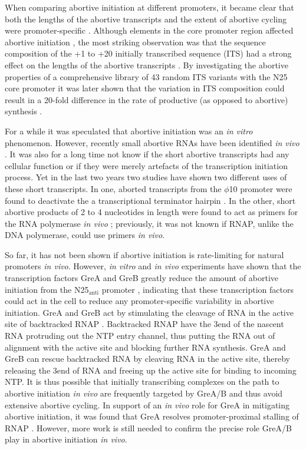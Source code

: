 When comparing abortive initiation at different promoters, it became clear that
both the lengths of the abortive transcripts and the extent of abortive cycling
were promoter-specific \cite{hsu_vitro_2003}. Although elements in the core
promoter region affected abortive initiation \cite{vo_vitro_2003}, the most
striking observation was that the sequence composition of the +1 to +20
initially transcribed sequence (ITS) had a strong effect on the lengths of the
abortive transcripts \cite{hsu_vitro_2003}. By investigating the abortive
properties of a comprehensive library of 43 random ITS variants with the N25
core promoter it was later shown that the variation in ITS composition could
result in a 20-fold difference in the rate of productive (as opposed to
abortive) synthesis \cite{hsu_initial_2006}. 

For a while it was speculated that abortive initiation was an \textit{in vitro}
phenomenon. However, recently small abortive RNAs have been identified
\textit{in vivo} \cite{goldman_direct_2009}. It was also for a long time not
know if the short abortive transcripts had any cellular function or if they
were merely artefacts of the transcription initiation process. Yet in the last
two years two studies have shown two different uses of these short transcripts.
In one, aborted transcripts from the $\phi$10 promoter were found to deactivate
the a transcriptional terminator hairpin \cite{lee_tiny_2010}. In the other,
short abortive products of 2 to 4 nucleotides in length were found to act as
primers for the RNA polymerase \textit{in vivo} \cite{goldman_nanornas_2011};
previously, it was not known if RNAP, unlike the DNA polymerase, could use
primers \textit{in vivo}.

So far, it has not been shown if abortive initiation is rate-limiting for
natural promoters \textit{in vivo}. However, \textit{in vitro} and \textit{in
vivo} experiments have shown that the transcription factors GreA and GreB
greatly reduce the amount of abortive initiation from the N25$_{\text{anti}}$
promoter \cite{hsu_escherichia_1995}, indicating that these transcription
factors could act in the cell to reduce any promoter-specific variability in
abortive initiation. GreA and GreB act by stimulating the cleavage of RNA in
the active site of backtracked RNAP \cite{toulme_grea_2000}. Backtracked RNAP
have the 3\p end of the nascent RNA protruding out the NTP entry channel, thus
putting the RNA out of alignment with the active site and blocking further RNA
synthesis. GreA and GreB can rescue backtracked RNA by cleaving RNA in the
active site, thereby releasing the 3\p end of RNA and freeing up the active
site for binding to incoming NTP. It is thus possible that initially
transcribing complexes on the path to abortive initiation \textit{in vivo} are
frequently targeted by GreA/B and thus avoid extensive abortive cycling.  In
support of an \textit{in vivo} role for GreA in mitigating abortive initiation,
it was found that GreA resolves promoter-proximal stalling of RNAP
\cite{kusuya_transcription_2011}. However, more work is still needed to confirm
the precise role GreA/B play in abortive initiation \textit{in vivo}.

